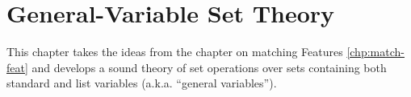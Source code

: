 \chapter{General-Variable Set Theory}\label{chp:genvar-set-theory}

This chapter takes the ideas from the chapter on matching Features
\ref{chp:match-feat}
and develops a sound theory of set operations over sets containing
both standard and list variables (a.k.a. ``general variables'').



